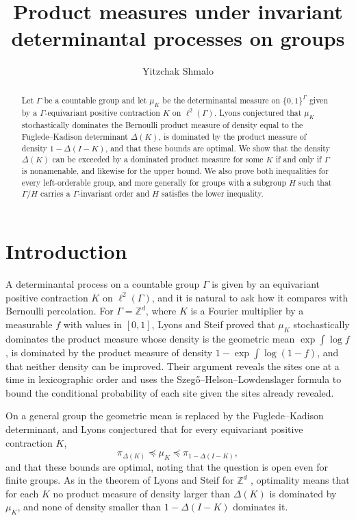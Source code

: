\documentclass[11pt]{amsart}
\title{Product measures under invariant determinantal processes on groups}
\author{Yitzchak Shmalo}
\date{}
\theoremstyle{remark}
\theoremstyle{definition}
\newcommand{\Ga}{\Gamma}
\newcommand{\FK}{\Delta}
\newcommand{\dom}{\preccurlyeq}
\newcommand{\ltwo}{\ell^2}
\begin{document}
\begin{abstract}
Let $\Ga$ be a countable group and let $\mu_K$ be the determinantal measure on $\{0,1\}^{\Ga}$ given by a
$\Ga$-equivariant positive contraction $K$ on $\ltwo(\Ga)$. Lyons conjectured that $\mu_K$ stochastically dominates
the Bernoulli product measure of density equal to the Fuglede--Kadison determinant $\FK(K)$, is dominated by the product
measure of density $1-\FK(I-K)$, and that these bounds are optimal. We show that the density $\FK(K)$ can be exceeded
by a dominated product measure for some $K$ if and only if $\Ga$ is nonamenable, and likewise for the upper bound. We
also prove both inequalities for every left-orderable group, and more generally for groups with a subgroup $H$ such
that $\Ga/H$ carries a $\Ga$-invariant order and $H$ satisfies the lower inequality.
\end{abstract}

\maketitle

\section{Introduction}\label{sec:intro}

A determinantal process on a countable group $\Ga$ is given by an equivariant positive contraction $K$ on $\ltwo(\Ga)$,
and it is natural to ask how it compares with Bernoulli percolation. For $\Ga=\mathbb Z^d$, where $K$ is a Fourier
multiplier by a measurable $f$ with values in $[0,1]$, Lyons and Steif \cite{LS03} proved that $\mu_K$ stochastically
dominates the product measure whose density is the geometric mean $\exp\int\log f$, is dominated by the product measure
of density $1-\exp\int\log(1-f)$, and that neither density can be improved. Their argument reveals the sites one at a
time in lexicographic order and uses the Szeg\H{o}--Helson--Lowdenslager formula to bound the conditional probability of
each site given the sites already revealed.

On a general group the geometric mean is replaced by the Fuglede--Kadison determinant, and Lyons
\cite[Conj.~5.7]{LyICM} conjectured that for every equivariant positive contraction $K$,
\[
\pi_{\FK(K)}\dom\mu_K\dom\pi_{1-\FK(I-K)},
\]
and that these bounds are optimal, noting that the question is open even for finite groups. As in the theorem of
Lyons and Steif for $\mathbb Z^d$ \cite[Thm.~5.3]{LS03}, optimality means that for each $K$ no product measure of
density larger than $\FK(K)$ is dominated by $\mu_K$, and none of density smaller than $1-\FK(I-K)$ dominates it.
\end{document}
